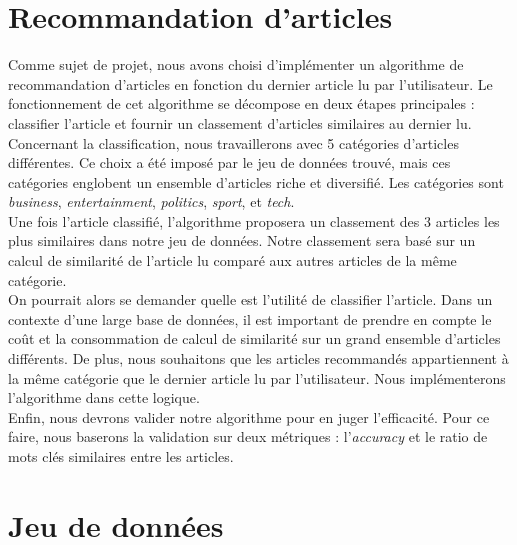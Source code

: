 \documentclass[a4paper,12pt]{article}
\begin{document}
\newpage
\maketitle
\tableofcontents

\newpage

\section{Recommandation d'articles}

Comme sujet de projet, nous avons choisi d'implémenter un algorithme de recommandation d'articles en fonction du dernier article lu par l'utilisateur. Le fonctionnement de cet algorithme se décompose en deux étapes principales : classifier l'article et fournir un classement d'articles similaires au dernier lu.\\

Concernant la classification, nous travaillerons avec 5 catégories d'articles différentes. Ce choix a été imposé par le jeu de données trouvé, mais ces catégories englobent un ensemble d'articles riche et diversifié. Les catégories sont \textit{business}, \textit{entertainment}, \textit{politics}, \textit{sport}, et \textit{tech}.\\

Une fois l'article classifié, l'algorithme proposera un classement des 3 articles les plus similaires dans notre jeu de données. Notre classement sera basé sur un calcul de similarité de l'article lu comparé aux autres articles de la même catégorie.\\

On pourrait alors se demander quelle est l'utilité de classifier l'article. Dans un contexte d'une large base de données, il est important de prendre en compte le coût et la consommation de calcul de similarité sur un grand ensemble d'articles différents. De plus, nous souhaitons que les articles recommandés appartiennent à la même catégorie que le dernier article lu par l'utilisateur. Nous implémenterons l'algorithme dans cette logique.\\

Enfin, nous devrons valider notre algorithme pour en juger l'efficacité. Pour ce faire, nous baserons la validation sur deux métriques : l'\textit{accuracy} et le ratio de mots clés similaires entre les articles.\\

\section{Jeu de données}
\end{document}

